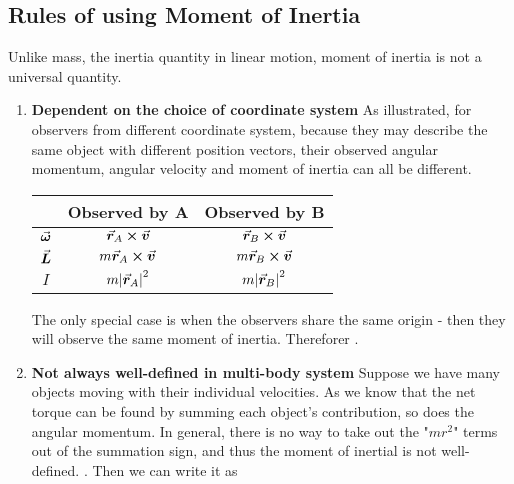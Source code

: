 \documentclass[class=article, crop=false, 12pt]{standalone}
\begin{document}
\subsection{Rules of using Moment of Inertia}

Unlike mass, the inertia quantity in linear motion, moment of inertia is not a universal quantity.

\begin{enumerate}
    \item \textbf{Dependent on the choice of coordinate system}
    As illustrated, for observers from different coordinate system, because they may describe the same object with different position vectors,
    their observed angular momentum, angular velocity and moment of inertia can all be different. 
    \begin{table}[h!]
    \centering
        \begin{tabular}{ c c c }
        & Observed by A & Observed by B \\ \hline \hline
        $\va*{\omega}$ & $\va*{r}_A\cross\va*{v}$ & $\va*{r}_B\cross\va*{v}$ \\ \hline
        $\va*{L}$ & $m\va*{r}_A\cross\va*{v}$ & $m\va*{r}_B\cross\va*{v}$ \\ \hline
        $I$ & $m\abs{\va*{r}_A}^2$ & $m\abs{\va*{r}_B}^2$ 
        \end{tabular}
    \end{table}
    The only special case is when the observers share the same origin - then they will observe the same moment of inertia. 
    Thereforer .
    \item \textbf{Not always well-defined in multi-body system}
    Suppose we have many objects moving with their individual velocities.
    As we know that the net torque can be found by summing each object's contribution, so does the angular momentum. 
    In general, there is no way to take out the "$mr^2$" terms out of the summation sign, and thus the moment of inertial is not well-defined. 
    . Then we can write it as 
\end{enumerate}
\end{document}
